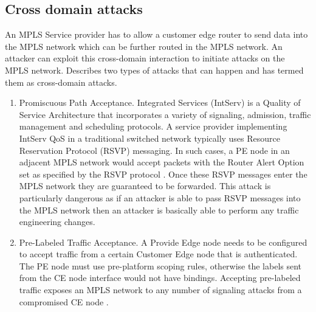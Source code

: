 \subsection{Cross domain attacks}
An MPLS Service provider has to allow a customer edge router to send data into the MPLS network which can be further routed in the MPLS network. An attacker can exploit this cross-domain interaction to initiate attacks on the MPLS network. \cite{spainhower2008security} Describes two types of attacks that can happen and has termed them as cross-domain attacks.
\begin{enumerate}
\item Promiscuous Path Acceptance.
Integrated Services (IntServ) \cite{davie2000mpls} is a Quality of Service Architecture that incorporates a variety of signaling, admission, traffic management and scheduling protocols. A service provider implementing IntServ QoS in a traditional switched network typically uses Resource Reservation Protocol (RSVP) messaging. In such cases, a PE node in an adjacent MPLS network would accept packets with the Router Alert Option set as specified by the RSVP protocol \cite{braden1997resource}. Once these RSVP messages enter the MPLS network they are guaranteed to be forwarded. This attack is particularly dangerous as if an attacker is able to pass RSVP messages into the MPLS network then an attacker is basically able to perform any traffic engineering changes.

\item Pre-Labeled Traffic Acceptance.
A Provide Edge node needs to be configured to accept traffic from a certain Customer Edge node that is authenticated. The PE node must use pre-platform scoping rules, otherwise the labels sent from the CE node interface would not have bindings. Accepting pre-labeled traffic exposes an MPLS network to any number of signaling attacks from a compromised CE node \cite{spainhower2008security}.
\end{enumerate}

